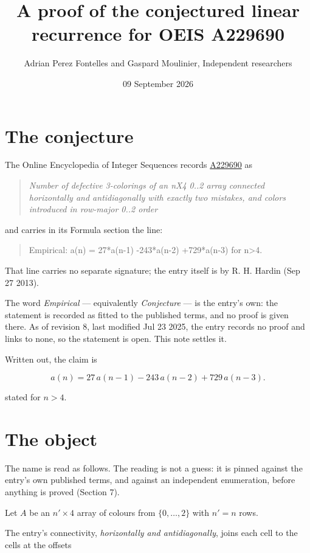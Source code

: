 \documentclass[11pt]{article}
\title{A proof of the conjectured linear recurrence for OEIS A229690}
\author{Adrian Perez Fontelles and Gaspard Moulinier, Independent researchers}
\date{09 September 2026}
\theoremstyle{definition}
\begin{document}
\maketitle
\section{The conjecture}

The Online Encyclopedia of Integer Sequences records \href{https://oeis.org/A229690}{A229690} as

\begin{quote}\itshape Number of defective 3-colorings of an nX4 0..2 array connected horizontally and antidiagonally with exactly two mistakes, and colors introduced in row-major 0..2 order\end{quote}

and carries in its Formula section the line:

\begin{quote}\ttfamily Empirical: a(n) = 27*a(n-1) -243*a(n-2) +729*a(n-3) for n>4.\end{quote}

That line carries no separate signature; the entry itself is by R. H. Hardin (Sep 27 2013).

The word {\itshape Empirical} --- equivalently {\itshape Conjecture} --- is the entry's own: the statement is recorded as fitted to the published terms, and no proof is given there. As of revision 8, last modified Jul 23 2025, the entry records no proof and links to none, so the statement is open. This note settles it.

Written out, the claim is

\[a(n) = 27\,a(n-1) - 243\,a(n-2) + 729\,a(n-3).\]

stated for $n > 4$.

\section{The object}

The name is read as follows. The reading is not a guess: it is pinned against the entry's own published terms, and against an independent enumeration, before anything is proved (Section 7).

Let $A$ be an $n' \times 4$ array of colours from $\{0,\dots,2\}$ with $n' = n$ rows.

The entry's connectivity, {\itshape horizontally and antidiagonally}, joins each cell to the cells at the offsets
\end{document}

